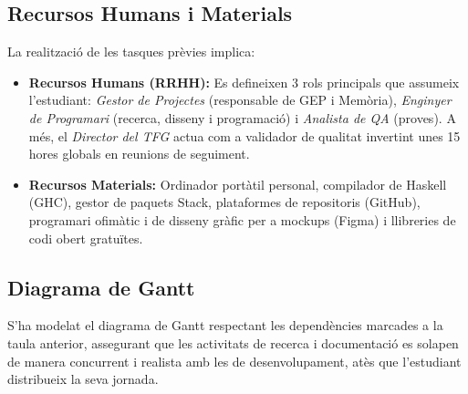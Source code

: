 \subsection{Recursos Humans i Materials}
La realització de les tasques prèvies implica:
\begin{itemize}
    \item \textbf{Recursos Humans (RRHH):} Es defineixen 3 rols principals que assumeix l'estudiant: \textit{Gestor de Projectes} (responsable de GEP i Memòria), \textit{Enginyer de Programari} (recerca, disseny i programació) i \textit{Analista de QA} (proves). A més, el \textit{Director del TFG} actua com a validador de qualitat invertint unes 15 hores globals en reunions de seguiment.
    \item \textbf{Recursos Materials:} Ordinador portàtil personal, compilador de Haskell (GHC), gestor de paquets Stack, plataformes de repositoris (GitHub), programari ofimàtic i de disseny gràfic per a mockups (Figma) i llibreries de codi obert gratuïtes.
\end{itemize}

\subsection{Diagrama de Gantt}
S'ha modelat el diagrama de Gantt respectant les dependències marcades a la taula anterior, assegurant que les activitats de recerca i documentació es solapen de manera concurrent i realista amb les de desenvolupament, atès que l'estudiant distribueix la seva jornada.

